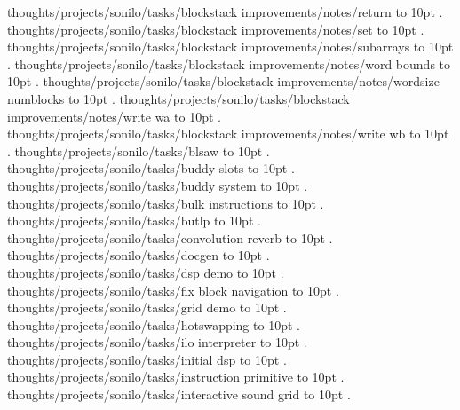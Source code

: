 \smallskip
thoughts/projects/sonilo/tasks/blockstack improvements/notes/return \leaders\hbox to 10pt {\hss.\hss}  \hfill {}
\smallskip
thoughts/projects/sonilo/tasks/blockstack improvements/notes/set \leaders\hbox to 10pt {\hss.\hss}  \hfill {}
\smallskip
thoughts/projects/sonilo/tasks/blockstack improvements/notes/subarrays \leaders\hbox to 10pt {\hss.\hss}  \hfill {}
\smallskip
thoughts/projects/sonilo/tasks/blockstack improvements/notes/word bounds \leaders\hbox to 10pt {\hss.\hss}  \hfill {}
\smallskip
thoughts/projects/sonilo/tasks/blockstack improvements/notes/wordsize numblocks \leaders\hbox to 10pt {\hss.\hss}  \hfill {}
\smallskip
thoughts/projects/sonilo/tasks/blockstack improvements/notes/write wa \leaders\hbox to 10pt {\hss.\hss}  \hfill {}
\smallskip
thoughts/projects/sonilo/tasks/blockstack improvements/notes/write wb \leaders\hbox to 10pt {\hss.\hss}  \hfill {}
\smallskip
thoughts/projects/sonilo/tasks/blsaw \leaders\hbox to 10pt {\hss.\hss}  \hfill {}
\smallskip
thoughts/projects/sonilo/tasks/buddy slots \leaders\hbox to 10pt {\hss.\hss}  \hfill {}
\smallskip
thoughts/projects/sonilo/tasks/buddy system \leaders\hbox to 10pt {\hss.\hss}  \hfill {}
\smallskip
thoughts/projects/sonilo/tasks/bulk instructions \leaders\hbox to 10pt {\hss.\hss}  \hfill {}
\smallskip
thoughts/projects/sonilo/tasks/butlp \leaders\hbox to 10pt {\hss.\hss}  \hfill {}
\smallskip
thoughts/projects/sonilo/tasks/convolution reverb \leaders\hbox to 10pt {\hss.\hss}  \hfill {}
\smallskip
thoughts/projects/sonilo/tasks/docgen \leaders\hbox to 10pt {\hss.\hss}  \hfill {}
\smallskip
thoughts/projects/sonilo/tasks/dsp demo \leaders\hbox to 10pt {\hss.\hss}  \hfill {}
\smallskip
thoughts/projects/sonilo/tasks/fix block navigation \leaders\hbox to 10pt {\hss.\hss}  \hfill {}
\smallskip
thoughts/projects/sonilo/tasks/grid demo \leaders\hbox to 10pt {\hss.\hss}  \hfill {}
\smallskip
thoughts/projects/sonilo/tasks/hotswapping \leaders\hbox to 10pt {\hss.\hss}  \hfill {}
\smallskip
thoughts/projects/sonilo/tasks/ilo interpreter \leaders\hbox to 10pt {\hss.\hss}  \hfill {}
\smallskip
thoughts/projects/sonilo/tasks/initial dsp \leaders\hbox to 10pt {\hss.\hss}  \hfill {}
\smallskip
thoughts/projects/sonilo/tasks/instruction primitive \leaders\hbox to 10pt {\hss.\hss}  \hfill {}
\smallskip
thoughts/projects/sonilo/tasks/interactive sound grid \leaders\hbox to 10pt {\hss.\hss}  \hfill {}
\smallskip
